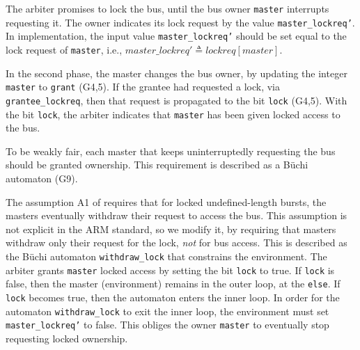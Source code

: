 \documentclass[copyright]{eptcs}
\begin{document}
The arbiter promises to lock the bus, until the bus owner \texttt{master} interrupts requesting it.
The owner indicates its lock request by the value \texttt{master\_lockreq'}.
In implementation, the input value \texttt{master\_lockreq'} should be set equal to the lock request of \texttt{master}, i.e., $\mathit{master\_lockreq}' \triangleq \mathit{lockreq}[\mathit{master}]$.

In the second phase, the master changes the bus owner, by updating the integer \texttt{master} to \texttt{grant} (G4,5).
If the grantee had requested a lock, via \texttt{grantee\_lockreq}, then that request is propagated to the bit \texttt{lock} (G4,5).
With the bit \texttt{lock}, the arbiter indicates that \texttt{master} has been given locked access to the bus.

To be weakly fair, each master that keeps uninterruptedly requesting the bus should be granted ownership.
This requirement is described as a B\"{u}chi automaton (G9).

The assumption A1 of \cite{Bloem12jcss} requires that for locked undefined-length bursts, the masters eventually withdraw their request to access the bus.
This assumption is not explicit in the ARM standard, so we modify it, by requiring that masters withdraw only their request for the lock, {\em not} for bus access.
This is described as the B\"{u}chi automaton \texttt{withdraw\_lock} that constrains the environment.
The arbiter grants \texttt{master} locked access by setting the bit \texttt{lock} to true.
If \texttt{lock} is false, then the master (environment) remains in the outer loop, at the \texttt{else}.
If \texttt{lock} becomes true, then the automaton enters the inner loop.
In order for the automaton \texttt{withdraw\_lock} to exit the inner loop, the environment must set \texttt{master\_lockreq'} to false.
This obliges the owner \texttt{master} to eventually stop requesting locked ownership.
\end{document}

